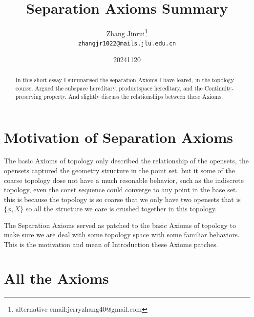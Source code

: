 \documentclass{article}
\title{Separation Axioms Summary}
\author{Zhang Jinrui\thanks{alternative email:jerryzhang40@gmail.com} \\ \texttt{zhangjr1022@mails.jlu.edu.cn}}
\date{20241120}  %
\begin{document}
\maketitle

\begin{abstract}
    In this short essay I summarised the separation Axioms I have
    leared, in the topology course. Argued the subspace hereditary,
    productspace hereditary, and the Continuity-preserving property.
    And slightly discuss the relationships between these Axioms.
\end{abstract}


\section{Motivation of Separation Axioms}
The basic Axioms of topology only described the relationship of the
opensets, the opensets captured the geometry structure in the point set.
but it some of the coarse topology dose not have a much resonable
behavior, such as the indiscrete topology, even the const sequence
could converge to any point in the base set. this is because the
topology is so coarse that we only have two opensets that is $\{\phi, X\}$
so all the structure we care is crushed together in this topology.

The Separation Axioms served as patched to the basic Axioms of topology
to make sure we are deal with some topology space with some familiar
behaviors. This is the motivation and mean of Introduction these
Axioms patches.\cite[script1]{MAT327topology1script}

\section{All the Axioms}
\end{document}
